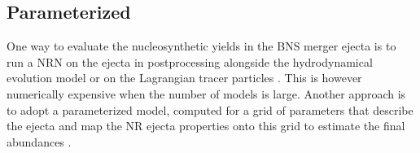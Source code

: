 %





\subsection{Parameterized \nuc{}}

One way to evaluate the nucleosynthetic yields in the \ac{BNS} merger ejecta is to run a \ac{NRN} 
on the ejecta in postprocessing alongside the hydrodynamical evolution model or 
on the Lagrangian tracer particles 
\citep[\eg][]{Goriely:2011vg,Korobkin:2012uy,Grossman:2013lqa,Wanajo:2014wha,Just:2014fka,Martin:2015hxa}.
This is however numerically expensive when the number of models is large. 
%
Another approach is to adopt a parameterized \nuc{} model, computed for a grid of parameters 
that describe the ejecta and map the \ac{NR} ejecta properties onto this grid to estimate the 
final abundances \citep{Lippuner:2015gwa}. 

